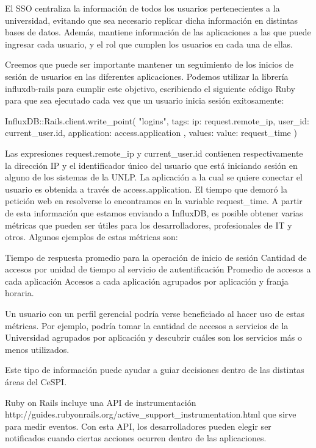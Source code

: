 El SSO centraliza la información de todos los usuarios pertenecientes a la universidad, evitando que sea necesario replicar dicha información en distintas bases de datos. Además, mantiene información de las aplicaciones a las que puede ingresar cada usuario, y el rol que cumplen los usuarios en cada una de ellas.

Creemos que puede ser importante mantener un seguimiento de los inicios de sesión de usuarios en las diferentes aplicaciones. Podemos utilizar la librería influxdb-rails para cumplir este objetivo, escribiendo el siguiente código Ruby para que sea ejecutado cada vez que un usuario inicia sesión exitosamente:

InfluxDB::Rails.client.write_point(
  "logins",
  tags:   { 
    ip: request.remote_ip,
    user_id: current_user.id,
    application: access.application
  },
  values: { value: request_time }
)

Las expresiones request.remote_ip y current_user.id contienen respectivamente la dirección IP y el identificador único del usuario que está iniciando sesión en alguno de los sistemas de la UNLP. La aplicación a la cual se quiere conectar el usuario es obtenida a través de access.application. El tiempo que demoró la petición web en resolverse lo encontramos en la variable request_time.
A partir de esta información que estamos enviando a InfluxDB, es posible obtener varias métricas que pueden ser útiles para los desarrolladores, profesionales de IT y otros. Algunos ejemplos de estas métricas son:

Tiempo de respuesta promedio para la operación de inicio de sesión
Cantidad de accesos por unidad de tiempo al servicio de autentificación
Promedio de accesos a cada aplicación
Accesos a cada aplicación agrupados por aplicación y franja horaria.

Un usuario con un perfil gerencial podría verse beneficiado al hacer uso de estas métricas. Por ejemplo, podría tomar la cantidad de accesos a servicios de la Universidad agrupados por aplicación y descubrir cuáles son los servicios más o menos utilizados.

Este tipo de información puede ayudar a guiar decisiones dentro de las distintas áreas del CeSPI.

Ruby on Rails incluye una API de instrumentación http://guides.rubyonrails.org/active_support_instrumentation.html que sirve para medir eventos. Con esta API, los desarrolladores pueden elegir ser notificados cuando ciertas acciones ocurren dentro de las aplicaciones.

